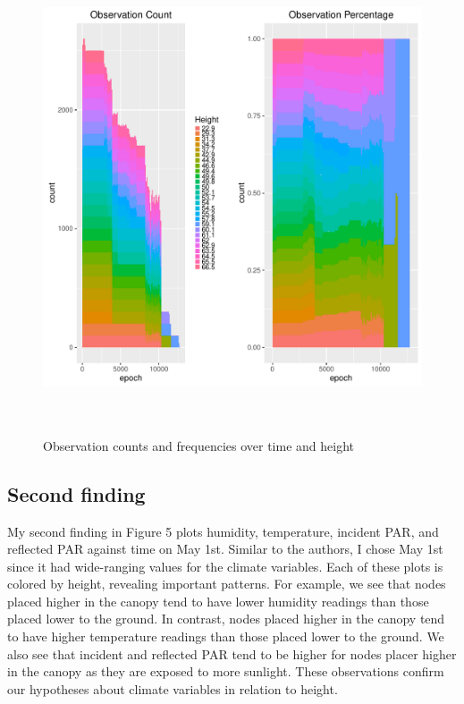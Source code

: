 \documentclass[11pt]{article}
\begin{document}
\begin{figure}
  \centering
    \includegraphics[width=\textwidth,height=14cm]{../graphs/finding1.pdf}
  \caption{Observation counts and frequencies over time and height}
  \label{fig:find1}
\end{figure}


\subsection{Second finding}

My second finding in Figure 5 plots humidity, temperature, incident PAR, and reflected PAR against time on May 1st. Similar to the authors, I chose May 1st since it had wide-ranging values for the climate variables. Each of these plots is colored by height, revealing important patterns. For example, we see that nodes placed higher in the canopy tend to have lower humidity readings than those placed lower to the ground. In contrast, nodes placed higher in the canopy tend to have higher temperature readings than those placed lower to the ground. We also see that incident and reflected PAR tend to be higher for nodes placer higher in the canopy as they are exposed to more sunlight. These observations confirm our hypotheses about climate variables in relation to height.  
\end{document}
